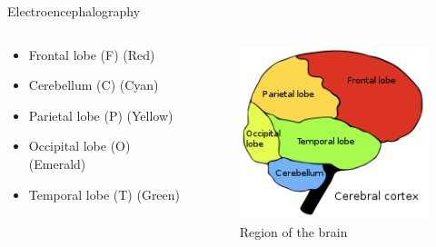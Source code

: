 \documentclass[xcolor=dvipsnames]{beamer} %
\begin{document}
    \begin{frame}{Electroencephalography}
        \begin{columns}
        \begin{column}{0.5\textwidth}
            \begin{itemize}
            \item Frontal lobe (F) (Red)
            \item Cerebellum (C) (Cyan)
            \item Parietal lobe (P) (Yellow)
            \item Occipital lobe (O) (Emerald)
            \item Temporal lobe (T) (Green)
            \end{itemize}
        \end{column}
        
        \begin{column}{0.5\textwidth}
            \begin{figure}
                \centering
                \includegraphics[scale=0.7]{images/Brain.png}
                \caption{Region of the brain}
                \label{fig:region}
            \end{figure}
        \end{column}
        \end{columns}
    \end{frame}
    
\end{document}
